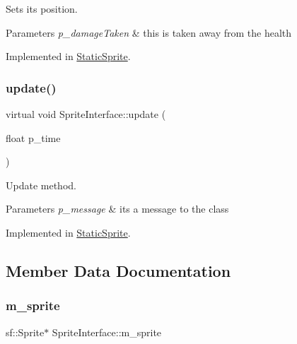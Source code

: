 Sets its position. 


\begin{DoxyParams}{Parameters}
{\em p\+\_\+damage\+Taken} & this is taken away from the health \\
\hline
\end{DoxyParams}


Implemented in \mbox{\hyperlink{class_static_sprite_add5e0038c152e9d7e65afd47ba36abce}{Static\+Sprite}}.

\mbox{\label{class_sprite_interface_a3153bba12e2561f1719a75dbff0e6b4a}} 
\subsubsection{\texorpdfstring{update()}{update()}}
{\footnotesize\ttfamily virtual void Sprite\+Interface\+::update (\begin{DoxyParamCaption}\item[{float}]{p\+\_\+time }\end{DoxyParamCaption})\hspace{0.3cm}{\ttfamily [pure virtual]}}



Update method. 


\begin{DoxyParams}{Parameters}
{\em p\+\_\+message} & its a message to the class \\
\hline
\end{DoxyParams}


Implemented in \mbox{\hyperlink{class_static_sprite_a2dd0c3a98082f45d0d77d53d1af13b90}{Static\+Sprite}}.



\subsection{Member Data Documentation}
\mbox{\label{class_sprite_interface_ad39fe3c5309c30a22ddfce60fa9f7c09}} 
\subsubsection{\texorpdfstring{m\+\_\+sprite}{m\_sprite}}
{\footnotesize\ttfamily sf\+::\+Sprite$\ast$ Sprite\+Interface\+::m\+\_\+sprite\hspace{0.3cm}{\ttfamily [protected]}}



